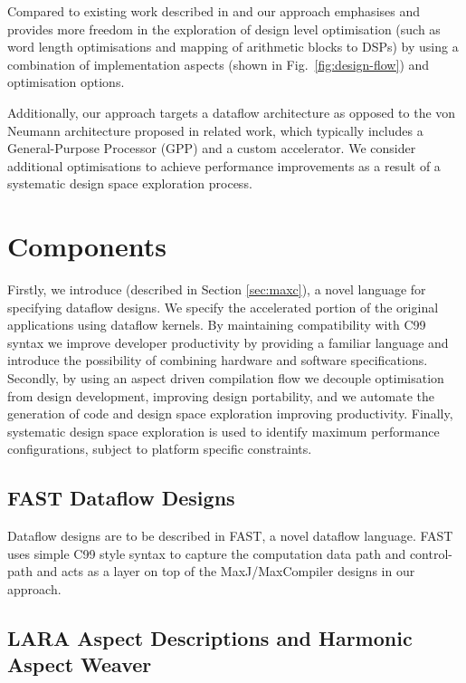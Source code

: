 Compared to existing work described in
\cite{Cardoso:Teixeira:Alves:Nobre:Diniz:Cutinho:Luk:2012} and
\cite{cardoso2011new} our approach emphasises and provides more
freedom in the exploration of design level optimisation (such as word
length optimisations and mapping of arithmetic blocks to DSPs) by
using a combination of implementation aspects (shown in
Fig.~\ref{fig:design-flow}) and \FAST{} optimisation options.

Additionally, our approach targets a dataflow architecture as opposed
to the von Neumann architecture proposed in related work, which
typically includes a General-Purpose Processor (GPP) and a custom
accelerator. We consider additional optimisations to achieve
performance improvements as a result of a systematic design space
exploration process.

\section{Components}

Firstly, we introduce \FAST{} (described in Section \ref{sec:maxc}), a
novel language for specifying dataflow designs. We specify the
accelerated portion of the original applications using \FAST{}
dataflow kernels. By maintaining compatibility with C99 syntax we
improve developer productivity by providing a familiar language and
introduce the possibility of combining hardware and software
specifications. Secondly, by using an aspect driven compilation flow
we decouple optimisation from design development, improving design
portability, and we automate the generation of code and design space
exploration improving productivity. Finally, systematic design space
exploration is used to identify maximum performance configurations,
subject to platform specific constraints.

\subsection{FAST Dataflow Designs}

Dataflow designs are to be described in FAST, a novel dataflow
language. FAST uses simple C99 style syntax to capture the computation
data path and control-path and acts as a layer on top of the
MaxJ/MaxCompiler designs in our approach.

\subsection{LARA Aspect Descriptions and Harmonic Aspect Weaver}


